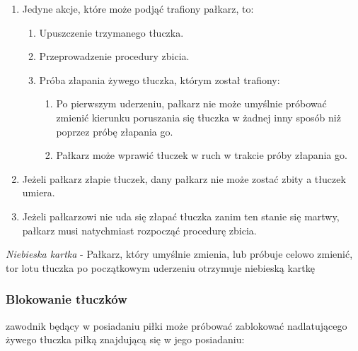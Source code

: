 \documentclass[12pt]{article}
\begin{document}
\begin{enumerate}
\item
    Jedyne akcje, które może podjąć trafiony pałkarz, to:
  
  \begin{enumerate}
  \item
        Upuszczenie trzymanego tłuczka.
      \item
        Przeprowadzenie procedury zbicia.
      \item
        Próba złapania żywego tłuczka, którym został trafiony:
    
    \begin{enumerate}
    \item
            Po pierwszym uderzeniu, pałkarz nie może umyślnie próbować zmienić
      kierunku poruszania się tłuczka w żadnej inny sposób niż poprzez
      próbę złapania go.
          \item
            Pałkarz może wprawić tłuczek w ruch w trakcie próby złapania go.
          \end{enumerate}
  \end{enumerate}
\item
  Jeżeli pałkarz złapie tłuczek, dany pałkarz nie może zostać zbity a
  tłuczek umiera.
\item
    Jeżeli pałkarzowi nie uda się złapać tłuczka zanim ten stanie się
  martwy, pałkarz musi natychmiast rozpocząć procedurę zbicia.
  \end{enumerate}

\emph{Niebieska kartka} - Pałkarz, który umyślnie zmienia, lub próbuje
celowo zmienić, tor lotu tłuczka po początkowym uderzeniu otrzymuje
niebieską kartkę

\subsubsection{Blokowanie tłuczków}

zawodnik będący w posiadaniu piłki może próbować zablokować
nadlatującego żywego tłuczka piłką znajdującą się w jego posiadaniu:
\end{document}
